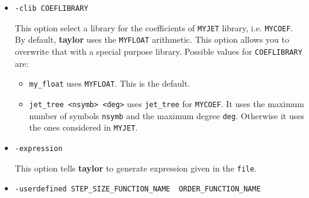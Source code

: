 \documentclass[10pt]{article}
\theoremstyle{remark}
\newcommand{\taylorname}{{\bf taylor}}
\newcommand{\myfloat}{{\tt MY\symbol{95}FLOAT}}
\newcommand{\myjet}{{\tt MY\symbol{95}JET}}
\newcommand{\mycoef}{{\tt MY\symbol{95}COEF}}
\begin{document}
\begin{itemize}
{This option select a jet library. By default, \taylorname{} uses the
\verb+jet_tree+ library. This option allows you to overwrite that with
a special purpose library. Possible values for \verb+JETLIBRARY+ are:
\begin{itemize}
    \item \verb+jet1_1+ one symbol, degree one. The arithmetic is
      implemented using C macros.
    \item \verb+jet1+  one symbol, arbitrary degree. 
    \item \verb+jet_1+ degree one, arbitrary number of symbols.
    \item \verb+jet2+ two symbols, arbitrary degree.
    \item \verb+jet_2+ degree two, arbitrary number of symbols.
    \item \verb+jet_m+ an naive implementation of the general case,
      arbitrary number of symbols, arbitrary degree. This
      implementation works well when the jet size is below 1000 terms,
      i.e., when ${{d+m} \choose {d}} < 1000$.
    \item \verb+jet_tree+ a general library\footnote{based on \url{http://www.maia.ub.es/dsg/param/chapter2.html}}. This is the default.
\end{itemize}
}
\item{\verb+-clib COEFLIBRARY+ 

This option select a library for the coefficients of \myjet{} library,
i.e. \mycoef{}. By default, \taylorname{} uses the \myfloat{}
arithmetic. This option allows you to overwrite that with a special
purpose library. Possible values for \verb+COEFLIBRARY+ are:
\begin{itemize}
    \item \verb+my_float+ uses \myfloat{}. This is the default.
    \item \verb+jet_tree <nsymb> <deg>+ uses \verb+jet_tree+ for
      \mycoef{}. It uses the maximum number of symbols \verb+nsymb+
      and the maximum degree \verb+deg+. Otherwise it uses the ones
      considered in \myjet{}.
\end{itemize}
}

\item{\verb+-expression+

This option tells \taylorname{} to generate expression given in the \verb+file+.}

\item{\verb+-userdefined STEP_SIZE_FUNCTION_NAME  ORDER_FUNCTION_NAME+

}
\end{itemize}
\end{document}
